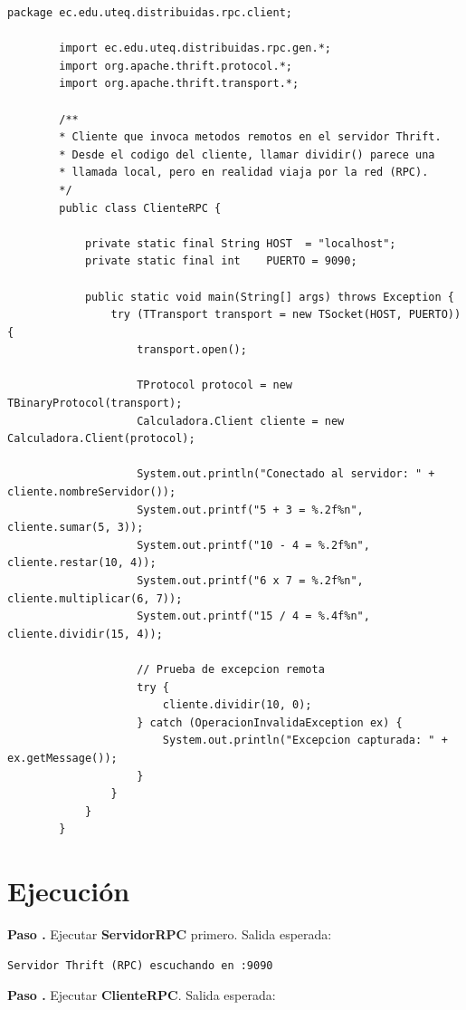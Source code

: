 \documentclass[12pt, a4paper, openany]{book}
\newcounter{paso}[section]
\newcommand{\paso}[1]{%
	\stepcounter{paso}%
	\medskip\noindent
	\begin{tcolorbox}[enhanced, colback=white, colframe=practiceBlue,
		boxrule=0.8pt, arc=3pt, left=6pt, right=6pt, top=4pt, bottom=4pt,
		before upper={\noindent}]
		\textcolor{practiceBlue}{\textbf{Paso \arabic{paso}.}} #1
	\end{tcolorbox}%
}
\begin{document}
	\begin{lstlisting}[style=JavaStyle, caption={ClienteRPC.java --- Cliente RPC con Thrift}]
		package ec.edu.uteq.distribuidas.rpc.client;
		
		import ec.edu.uteq.distribuidas.rpc.gen.*;
		import org.apache.thrift.protocol.*;
		import org.apache.thrift.transport.*;
		
		/**
		* Cliente que invoca metodos remotos en el servidor Thrift.
		* Desde el codigo del cliente, llamar dividir() parece una
		* llamada local, pero en realidad viaja por la red (RPC).
		*/
		public class ClienteRPC {
			
			private static final String HOST  = "localhost";
			private static final int    PUERTO = 9090;
			
			public static void main(String[] args) throws Exception {
				try (TTransport transport = new TSocket(HOST, PUERTO)) {
					transport.open();
					
					TProtocol protocol = new TBinaryProtocol(transport);
					Calculadora.Client cliente = new Calculadora.Client(protocol);
					
					System.out.println("Conectado al servidor: " + cliente.nombreServidor());
					System.out.printf("5 + 3 = %.2f%n", cliente.sumar(5, 3));
					System.out.printf("10 - 4 = %.2f%n", cliente.restar(10, 4));
					System.out.printf("6 x 7 = %.2f%n", cliente.multiplicar(6, 7));
					System.out.printf("15 / 4 = %.4f%n", cliente.dividir(15, 4));
					
					// Prueba de excepcion remota
					try {
						cliente.dividir(10, 0);
					} catch (OperacionInvalidaException ex) {
						System.out.println("Excepcion capturada: " + ex.getMessage());
					}
				}
			}
		}
	\end{lstlisting}
	
	\section{Ejecución}
	
	\paso{Ejecutar \textbf{ServidorRPC} primero. Salida esperada:}
	
	\begin{resultadobox}
		\begin{lstlisting}[style=BashStyle]
			Servidor Thrift (RPC) escuchando en :9090
		\end{lstlisting}
	\end{resultadobox}
	
	\paso{Ejecutar \textbf{ClienteRPC}. Salida esperada:}
	
\end{document}
